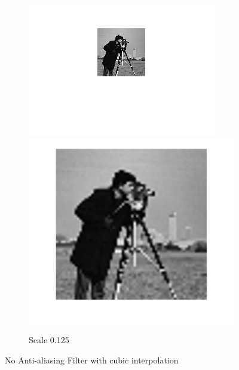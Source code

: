 \documentclass{article}
\begin{document}
\begin{figure}[h!]
\begin{subfigure}[t]{0.3\textwidth}
		\includegraphics[width=\linewidth]{./output_images/DOWN_no_anti-alias_cubic_scale_0_125000.png}
		\includegraphics[width=\linewidth]{./output_images/UP_no_anti-alias_cubic_scale_0_125000.png}
		\caption{Scale 0.125}
	\end{subfigure}
	\caption{No Anti-aliasing Filter with cubic interpolation}
\end{figure}
\end{document}

